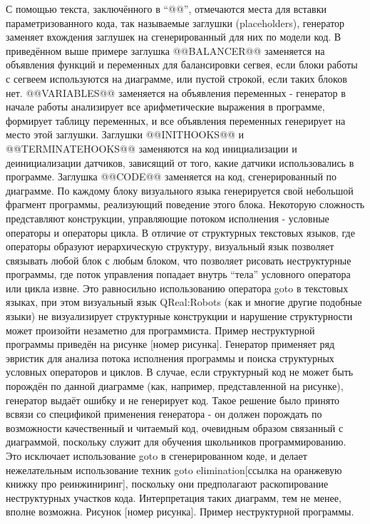 С помощью текста, заключённого в “@@”, отмечаются места для вставки параметризованного кода, так называемые заглушки (placeholders), генератор заменяет вхождения заглушек на сгенерированный для них по модели код. В приведённом выше примере заглушка @@BALANCER@@ заменяется на объявления функций и переменных для балансировки сегвея, если блоки работы с сегвеем используются на диаграмме, или пустой строкой, если таких блоков нет. @@VARIABLES@@ заменяется на объявления переменных - генератор в начале работы анализирует все арифметические выражения в программе, формирует таблицу переменных, и все объявления переменных генерирует на место этой заглушки. Заглушки @@INITHOOKS@@ и @@TERMINATEHOOKS@@ заменяются на код инициализации и деинициализации датчиков, зависящий от того, какие датчики использовались в программе. 
Заглушка @@CODE@@ заменяется на код, сгенерированный по диаграмме. По каждому блоку визуального языка генерируется свой небольшой фрагмент программы, реализующий поведение этого блока. Некоторую сложность представляют конструкции, управляющие потоком исполнения - условные операторы и операторы цикла. В отличие от структурных текстовых языков, где операторы образуют иерархическую структуру, визуальный язык позволяет связывать любой блок с любым блоком, что позволяет рисовать неструктурные программы, где поток управления попадает внутрь “тела” условного оператора или цикла извне. Это равносильно использованию оператора goto в текстовых языках, при этом визуальный язык QReal:Robots (как и многие другие подобные языки) не визуализирует структурные конструкции и нарушение структурности может произойти незаметно для программиста. Пример неструктурной программы приведён на рисунке [номер рисунка]. Генератор применяет ряд эвристик для анализа потока исполнения программы и поиска структурных условных операторов и циклов. В случае, если структурный код не может быть порождён по данной диаграмме (как, например, представленной на рисунке), генератор выдаёт ошибку и не генерирует код. Такое решение было принято всвязи со спецификой применения генератора - он должен порождать по возможности качественный и читаемый код, очевидным образом связанный с диаграммой, поскольку служит для обучения школьников программированию. Это исключает использование goto в сгенерированном коде, и делает нежелательным использование техник goto elimination[ссылка на оранжевую книжку про реинжиниринг], поскольку они предполагают раскопирование неструктурных участков кода. Интерпретация таких диаграмм, тем не менее, вполне возможна.
Рисунок [номер рисунка]. Пример неструктурной программы.
